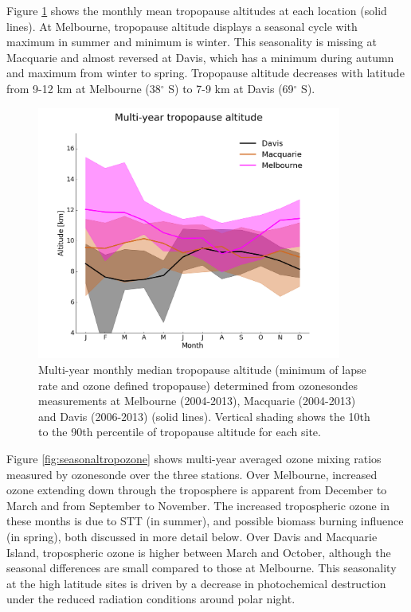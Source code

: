     Figure \ref{fig:seasonaltpheights} shows the monthly mean tropopause altitudes at each location (solid lines).
    At Melbourne, tropopause altitude displays a seasonal cycle with maximum in summer and minimum is winter.
    This seasonality is missing at Macquarie and almost reversed at Davis, which has a minimum during autumn and maximum from winter to spring.
    Tropopause altitude decreases with latitude from 9-12 km at Melbourne (38$^\circ$ S) to 7-9 km at Davis (69$^\circ$ S).

    \begin{figure}[t] 
      \includegraphics[width=10cm]{figures/tpheights}
      \caption{%
	Multi-year monthly median tropopause altitude (minimum of lapse rate and ozone defined tropopause) determined from ozonesondes measurements at Melbourne (2004-2013), Macquarie (2004-2013) and Davis (2006-2013) (solid lines).
	Vertical shading shows the 10th to the 90th percentile of tropopause altitude for each site.}
      \label{fig:seasonaltpheights}
    \end{figure}

    Figure \ref{fig:seasonaltropozone} shows multi-year averaged ozone mixing ratios measured by ozonesonde over the three stations.
    Over Melbourne, increased ozone extending down through the troposphere is apparent from December to March and from September to November.
    The increased tropospheric ozone in these months is due to STT (in summer), and possible biomass burning influence (in spring), both discussed in more detail below.
    Over Davis and Macquarie Island, tropospheric ozone is higher between March and October, although the seasonal differences are small compared to those at Melbourne.
    This seasonality at the high latitude sites is driven by a decrease in photochemical destruction under the reduced radiation conditions around polar night. %
    
